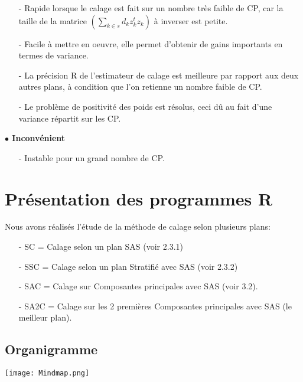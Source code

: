 \documentclass[11pt,fleqn]{book} %
\begin{document}
\begin{enumerate}
\item[-] Rapide lorsque le calage est fait sur un nombre très faible de CP, car la taille de la matrice $\left( \sum_{k\in s} d_k z_k ^t z_k \right)$ à inverser est petite.
\item[-] Facile à mettre en oeuvre, elle permet d’obtenir de gains importants en termes de
variance.
\item[-] La précision R de l'estimateur de calage est meilleure par rapport aux deux autres plans, à condition que l'on retienne un nombre faible de CP.
\item[-] Le problème de positivité des poids est résolus, ceci dû au fait d'une variance répartit sur les CP.
\end{enumerate}

\vspace{1em}

\textbf{$\bullet$ Inconvénient}

\vspace{1em}

\begin{enumerate}
\item[-]Instable pour un grand nombre de CP.
\end{enumerate}


\chapter{Présentation des programmes R}

Nous avons réalisés l'étude de la méthode de calage selon plusieurs plans:

\begin{enumerate}
\item[-] SC = Calage selon un plan SAS  (voir 2.3.1)
\item[-] SSC = Calage selon un plan Stratifié avec SAS (voir 2.3.2) 
\item[-] SAC = Calage sur Composantes principales avec SAS (voir 3.2).
\item[-] SA2C =  Calage sur les 2 premières Composantes principales avec SAS (le meilleur plan).

\end{enumerate}

\section{Organigramme}
\texttt{[image: Mindmap.png]}
\end{document}
